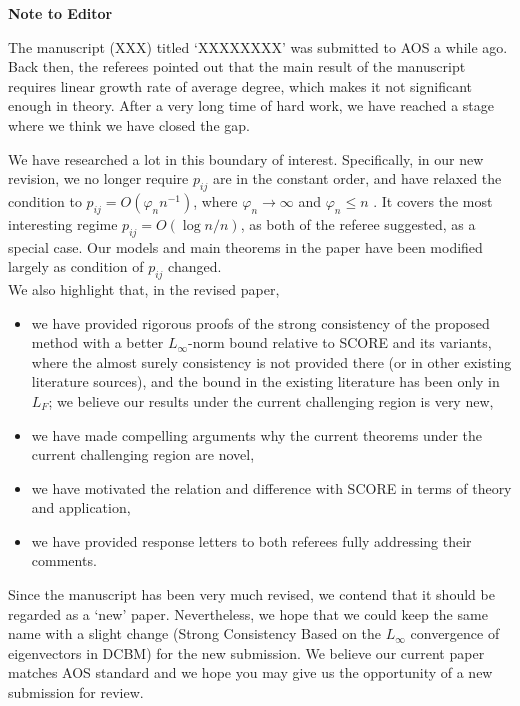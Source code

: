 \documentclass[12pt]{article}
\begin{document}


\begin{center}
	{\bf \large Note to Editor}
\end{center}
The manuscript (XXX) titled `XXXXXXXX' was submitted
to AOS a while ago. Back then, the referees pointed out that the main result of the manuscript requires linear growth rate of average degree, 
which makes it not significant enough in theory. After a very long time of hard work, we have reached a stage where we think we have closed
the gap. 

We have researched a lot in this boundary of interest. Specifically,  in our new revision, we no longer require $p_{ij}$ are in the constant order, and have relaxed the condition to  $p_{ij}=O(\varphi_n n^{-1})$, where $\varphi_n\to\infty$ and $\varphi_n\le n$ . It covers the most interesting regime $p_{ij}=O(\log n/n)$, as both of the referee suggested, as a special case. Our models and main theorems in the paper have been modified largely as condition of $p_{ij}$ changed.\\

We also highlight that, in the revised paper, 

\begin{itemize}
\item we have provided rigorous proofs of the strong consistency of the proposed method with a better $L_\infty$-norm bound relative to SCORE and its variants, where the almost surely consistency is not provided there (or in other existing literature sources), and the bound in the existing literature has been only in $L_F$; we believe our results under the current challenging region is very new,

\item we have made compelling arguments why the current theorems under the current challenging region are novel,

\item we have motivated the relation and difference with SCORE in terms of theory and application,

\item we have provided response letters to both referees fully addressing their comments.
\end{itemize}
Since the manuscript has been very much revised, we contend that it should be regarded
as a `new' paper. Nevertheless, we hope that we could keep the same name with a slight change (Strong Consistency Based on the $L_\infty$ convergence of eigenvectors in DCBM) for the new
submission. We believe our current paper matches AOS standard and we hope you may
give us the opportunity of a new submission for review.
\end{document}

